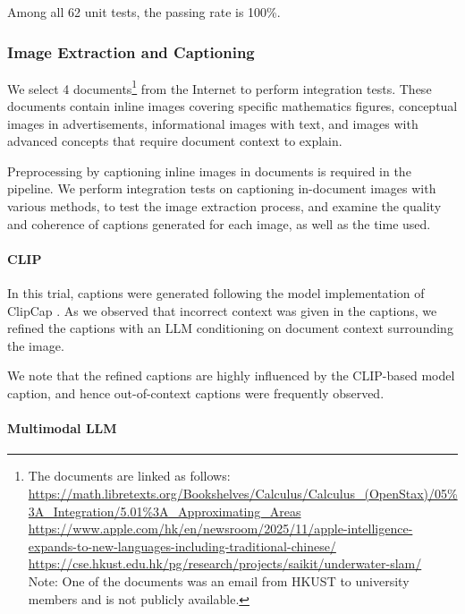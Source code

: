 Among all 62 unit tests, the passing rate is 100\%.

\subsubsection{Image Extraction and Captioning}
\label{sec:captioningtests}

We select 4 documents\footnote{The documents are linked as follows: \\
\url{https://math.libretexts.org/Bookshelves/Calculus/Calculus_(OpenStax)/05\%3A_Integration/5.01\%3A\_Approximating_Areas} \\
\url{https://www.apple.com/hk/en/newsroom/2025/11/apple-intelligence-expands-to-new-languages-including-traditional-chinese/} \\
\url{https://cse.hkust.edu.hk/pg/research/projects/saikit/underwater-slam/} \\
Note: One of the documents was an email from HKUST to university members and is not publicly available.} 
from the Internet to perform integration tests.
These documents contain inline images covering specific mathematics figures, conceptual images in advertisements, informational images with text, 
and images with advanced concepts that require document context to explain. 

Preprocessing by captioning inline images in documents is required in the pipeline. 
We perform integration tests on captioning in-document images with various methods, 
to test the image extraction process, and examine the quality and coherence of captions generated for each image, as well as the time used. 

\paragraph{CLIP}

In this trial, captions were generated following the model implementation of ClipCap \cite{mokady2021clipcapclipprefiximage}. 
As we observed that incorrect context was given in the captions, 
we refined the captions with an LLM conditioning on document context surrounding the image. 

We note that the refined captions are highly influenced by the CLIP-based model caption, 
and hence out-of-context captions were frequently observed. 

\paragraph{Multimodal LLM}

